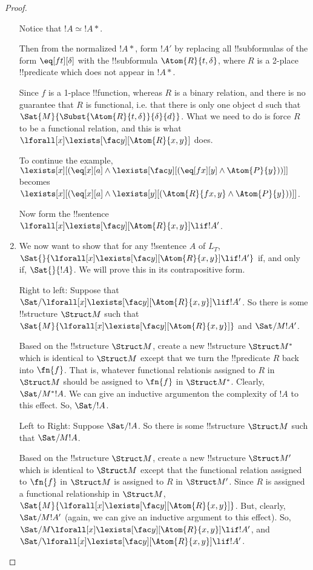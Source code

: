\documentclass[../../../include/open-logic-section]{subfiles}
\begin{document}
\begin{proof}
\begin{enumerate}
Notice that $ !A \simeq !A*$.

Then from the normalized $!A*$, form $!A'$ by replacing all
!!{subformula}s of the form $\eq[ft][\delta]$ with the 
!!{subformula} $\Atom{R}{t,\delta}$, where $R$
is a 2-place !!{predicate} which does not appear in $!A*$.

Since $f$ is a 1-place !!{function}, whereas $R$ is a binary relation, and
there is no guarantee that $R$ is functional, i.e. that there is only one
object d such that $\Sat{M}{\Subst{\Atom{R}{t,\delta}}{\delta}{d}}$.
 What we need to do is force $R$ to be a functional relation, and this 
is what $\lforall[x]\lexists[\fac y][\Atom{R}{x,y}]$ does.

To continue the example, $\lexists[x][(\eq[x][a] \land
\lexists[\fac y][(\eq[fx][y] \land \Atom{P}{y}))]]$ becomes
$\lexists[x][(\eq[x][a] \land \lexists[y][(\Atom{R}{fx,y} 
\land \Atom{P}{y}))]]$.

Now form the !!{sentence} $\lforall[x]\lexists[\fac y][\Atom{R}{x,y}]\lif !A'$.


\item We now want to show that for any !!{sentence} $A$ of $L_T$,
$\Sat{}{\lforall[x]\lexists[\fac y][\Atom{R}{x,y}]\lif !A'}$ if, and only if,
$\Sat{}{!A}$. We will prove this in its contrapositive form.

Right to left: Suppose that
$\Sat/{}{\lforall[x]\lexists[\fac y][\Atom{R}{x,y}]\lif !A'}$. So there is some
!!{structure} $\Struct M$ such that
$\Sat{M}{\lforall[x]\lexists[\fac y][\Atom{R}{x,y}]}$ and $\Sat/{M}{!A'}$.

Based on the !!{structure} $\Struct M$, create a new !!{structure}
$\Struct M^*$ which is identical to $\Struct M$ except that we turn the
!!{predicate} $R$ back into $\fn{f}$. That is, whatever functional
relationis
assigned to $R$ in $\Struct M$ should be assigned to $\fn{f}$ in
$\Struct M^*$. Clearly, $\Sat/{M^*}{!A}$. We can give an inductive
argumenton the complexity of $!A$ to this effect. So, $\Sat/{}{!A}$.

Left to Right: Suppose $\Sat/{}{!A}$. So there is some !!{structure}
$\Struct M$ such that $\Sat/{M}{!A}$.

Based on the !!{structure} $\Struct M$, create a new !!{structure}
$\Struct M'$ which is identical to $\Struct M$ except that the functional
relation assigned to $\fn{f}$ in $\Struct M$ is assigned to $R$ in
$\Struct M'$. Since $R$ is assigned a functional relationship in
$\Struct M$, $\Sat{M}{\lforall[x]\lexists[\fac y][\Atom{R}{x,y}]}$. But,
clearly, $\Sat/{M}{!A'}$ (again, we can give an inductive argument to this
effect). So, $\Sat/{M}{\lforall[x]\lexists[\fac y][\Atom{R}{x,y}]\lif !A'}$,
and$\Sat/{}{\lforall[x]\lexists[\fac y][\Atom{R}{x,y}]\lif !A'}$.


\end{enumerate}
\end{proof}
\end{document}
